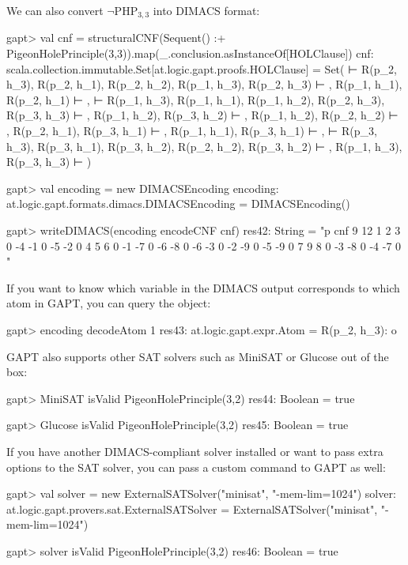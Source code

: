 \documentclass[a4paper,11pt]{book}
\newcommand{\cli}[1]{{\ttfamily {#1}}}
\begin{document}
We can also convert $\neg\mathrm{PHP}_{3,3}$ into DIMACS format:
\begin{clilisting}
gapt> val cnf = structuralCNF(Sequent() :+ PigeonHolePrinciple(3,3)).map(_.conclusion.asInstanceOf[HOLClause])
cnf: scala.collection.immutable.Set[at.logic.gapt.proofs.HOLClause] = Set( ⊢ R(p_2, h_3), R(p_2, h_1), R(p_2, h_2), R(p_1, h_3), R(p_2, h_3) ⊢ , R(p_1, h_1), R(p_2, h_1) ⊢ ,  ⊢ R(p_1, h_3), R(p_1, h_1), R(p_1, h_2), R(p_2, h_3), R(p_3, h_3) ⊢ , R(p_1, h_2), R(p_3, h_2) ⊢ , R(p_1, h_2), R(p_2, h_2) ⊢ , R(p_2, h_1), R(p_3, h_1) ⊢ , R(p_1, h_1), R(p_3, h_1) ⊢ ,  ⊢ R(p_3, h_3), R(p_3, h_1), R(p_3, h_2), R(p_2, h_2), R(p_3, h_2) ⊢ , R(p_1, h_3), R(p_3, h_3) ⊢ )

gapt> val encoding = new DIMACSEncoding
encoding: at.logic.gapt.formats.dimacs.DIMACSEncoding = DIMACSEncoding()

gapt> writeDIMACS(encoding encodeCNF cnf)
res42: String =
"p cnf 9 12
1 2 3 0
-4 -1 0
-5 -2 0
4 5 6 0
-1 -7 0
-6 -8 0
-6 -3 0
-2 -9 0
-5 -9 0
7 9 8 0
-3 -8 0
-4 -7 0
"

\end{clilisting}

If you want to know which variable in the DIMACS output corresponds to which
atom in GAPT, you can query the \cli{DIMACSEncoding} object:
\begin{clilisting}
gapt> encoding decodeAtom 1
res43: at.logic.gapt.expr.Atom = R(p_2, h_3): o

\end{clilisting}

GAPT also supports other SAT solvers such as MiniSAT or Glucose out of the box:
\begin{clilisting}
gapt> MiniSAT isValid PigeonHolePrinciple(3,2)
res44: Boolean = true

\end{clilisting}
\begin{clilisting}
gapt> Glucose isValid PigeonHolePrinciple(3,2)
res45: Boolean = true

\end{clilisting}

If you have another DIMACS-compliant solver installed or want to pass extra
options to the SAT solver, you can pass a custom command to GAPT as well:
\begin{clilisting}
gapt> val solver = new ExternalSATSolver("minisat", "-mem-lim=1024")
solver: at.logic.gapt.provers.sat.ExternalSATSolver = ExternalSATSolver("minisat", "-mem-lim=1024")

gapt> solver isValid PigeonHolePrinciple(3,2)
res46: Boolean = true

\end{clilisting}
\end{document}
